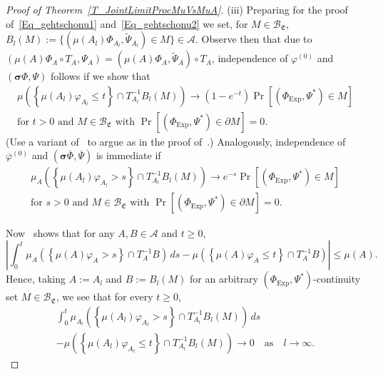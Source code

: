 \documentclass[10pt]{amsart}
\theoremstyle{definition}\newtheorem{defi}[theo]{Definition}\newtheorem{rema}[theo]{Remark}\newtheorem{exam}[theo]{Example}\newtheorem{exem}[theo]{Example}\newtheorem{nota}[theo]{Notation}
\newcommand{\clA}{\mathcal{A}}
\newcommand{\clB}{\mathcal{B}}
\newcommand{\Expl}{\mathrm{Exp}}
\newcommand{\bfsig}{\boldsymbol{\sigma}}
\newcommand{\frkE}{\mathfrak{E}}
\begin{document}
\begin{proof}[{Proof of Theorem~\ref{T_JointLimitProcMuVsMuA}}]
\vspace{6pt}
\noindent (iii) Preparing for the proof of~\eqref{Eq_gehtschonu1} and~\eqref{Eq_gehtschonu2} we set, for $M\in\clB_{\frkE}$, $B_{l}(M):=\{(\mu(A_{l})\Phi_{A_{l} },\widetilde{\Psi}_{A_{l}})\in M\}\in\clA$. Observe then that due to $(\mu(A)\Phi_{A}\circ T_{A},\Psi_{A})=(\mu(A)\Phi_{A},\widetilde{\Psi} _{A})\circ T_{A}$, independence of $\varphi^{(0)}$ and $(\bfsig
\Phi,\Psi)$ follows if we show that
\begin{equation}\label{Eq_bhbhggggg1}
\begin{gathered}
\mu\left(\left\{\mu(A_{l})\varphi_{A_{l}}\leq t\right\}\cap T_{A_{l}}^{-1} B_{l}(M)\right) \longrightarrow\left(1-e^{-t}\right)\Pr\left[\left(\Phi_{\Expl},\Psi^{\ast }\right)\in M\right]\\
\text{for }t>0\text{ and }M\in\clB_{\frkE}\text{ with }\Pr \left[\left(\Phi_{\Expl},\Psi^{\ast}\right)\in\partial M\right]=0.
\end{gathered}
\end{equation}
(Use a variant of~\cite[Theorem~2.3]{Bi} to argue as in the proof of~\cite[Theorem~2.8]{Bi}.) Analogously, independence of $\overline{\varphi}^{(0)}$ and $(\bfsig\overline{\Phi},\overline{\Psi})$ is immediate if
\begin{equation}\label{Eq_bhbhggggg}
\begin{gathered}
\mu_{A}\left(\left\{\mu(A_{l})\varphi_{A_{l}}>s\right\}\cap T_{A_{l}}^{-1} B_{l}(M)\right) \longrightarrow e^{-s}\Pr\left[\left(\Phi_{\Expl},\Psi^{\ast }\right)\in M\right]\\
\text{for }s>0\text{ and }M\in\clB_{\frkE}\text{ with }\Pr \left[\left(\Phi_{\Expl},\Psi^{\ast}\right)\in\partial M\right]=0.
\end{gathered}
\end{equation}


Now~\cite[Lemma~4.1]{Z11} shows that for any $A,B\in\clA$ and $t\geq0$,
\begin{equation}
\left\vert \int_{0}^{t}\mu_{A}\left(\left\{\mu(A)\varphi_{A}>s\right\}\cap T_{A} ^{-1}B\right) \,ds-\mu\left(\left\{\mu(A)\varphi_{A}\leq t\right\}\cap T_{A} ^{-1}B\right) \right\vert \leq\mu(A).
\end{equation}
Hence, taking $A:=A_{l}$ and $B:=B_{l}(M)$ for an arbitrary $(\Phi _{\Expl},\Psi^{\ast})$-continuity set $M\in\clB_{\frkE}$, we see that for every $t\geq0$,
\begin{multline}\label{Eq_KeyFromZ11Nice}
\int_{0}^{t}\mu_{A_{l}}  \left(\left\{\mu(A_{l})\varphi_{A_{l}}>s\right\}\cap T_{A_{l}}^{-1}B_{l}(M)\right) \,ds\\
-\mu\left(\left\{\mu(A_{l})\varphi_{A_{l}}\leq t\right\}\cap T_{A_{l}}^{-1} B_{l}(M)\right) \longrightarrow0\quad\text{as}\quad l\rightarrow\infty.
\end{multline}



\end{proof}
\end{document}
